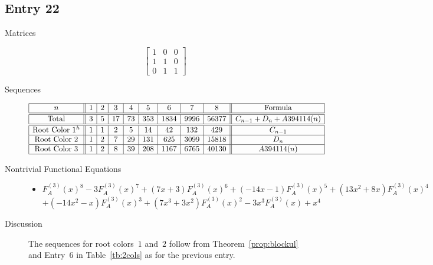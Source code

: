 \documentclass[12pt]{amsart}
\newcommand{\gff}[2]{F_{#2}^{(#1)}(x)}
\newcommand{\gfa}[1]{\gff{#1}{A}}
\begin{document}
\subsection*{Entry 22}
\begin{description}
    \item[Matrices]
    
    \[\begin{bmatrix}
1 & 0 & 0 \\
1 & 1 & 0 \\
0 & 1 & 1
\end{bmatrix}\]
    \item[Sequences]\hspace*{\fill}\vspace{-0.5cm}
    \begin{center}
        \[
        \begin{array}{|c||c|c|c|c|c|c|c|c||c|}\hline
           n  & 1 & 2 & 3 & 4 & 5 & 6 & 7 & 8  & \text{Formula}\\\hline\hline
           \text{Total}  & 3 & 5 & 17 & 73 & 353 & 1834 & 9996 & 56377 & C_{n-1}+D_n+A394114(n)\\\hline\hline
           \text{Root Color }1^{h} & 1 & 1 & 2 & 5 & 14 & 42 & 132 & 429 & C_{n-1}\\\hline
           \text{Root Color }2 & 1 & 2 & 7 & 29 & 131 & 625 & 3099 & 15818 & D_n\\\hline
           \text{Root Color }3 & 1 & 2 & 8 & 39 & 208 & 1167 & 6765 & 40130 & A394114(n)\\\hline
        \end{array}
        \]
    \end{center}
    
    \item[Nontrivial Functional Equations]\hspace*{\fill}

    \begin{itemize}
\item $\gfa{3}^8-3\gfa{3}^7+(7x + 3)\gfa{3}^6+(-14x - 1)\gfa{3}^5+(13x^2 + 8x)\gfa{3}^4$ $+(-14x^2 - x)\gfa{3}^3+(7x^3 + 3x^2)\gfa{3}^2-3x^3\gfa{3}+x^4$
\end{itemize}
        \item[Discussion] The sequences for root colors~$1$ and~$2$ follow from Theorem~\ref{prop:blockul} and Entry~6 in Table~\ref{tb:2cols} as for the previous entry.
\end{description}
\end{document}
